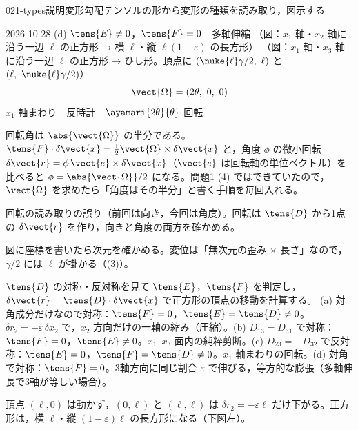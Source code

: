 \documentclass[uplatex,dvipdfmx,a4paper,11pt]{jsarticle}
\begin{document}
\begin{mondai}{021-types}{説明}{変形勾配テンソルの形から変形の種類を読み取り，図示する}
\begin{kotaeutsushi}{2026-10-28}
(d) $\tens{E}\neq0$，$\tens{F}=0$　多軸伸縮
（図：$x_{1}$ 軸・$x_{2}$ 軸に沿う一辺 $\ell$ の正方形 → 横 $\ell$・縦 $\ell(1-\varepsilon)$ の長方形）
（図：$x_{1}$ 軸・$x_{3}$ 軸に沿う一辺 $\ell$ の正方形 → ひし形。頂点に $(\nuke{\ell}\gamma/2,\ \ell)$ と $(\ell,\ \nuke{\ell}\gamma/2)$）
\[ \vect{\Omega}=(2\theta,\ 0,\ 0) \]
$x_{1}$ 軸まわり　反時計　$\ayamari{2\theta}{\theta}$ 回転
\end{kotaeutsushi}
\begin{kizuki}
\item 回転角は $\abs{\vect{\Omega}}$ の半分である。$\tens{F}\cdot\delta\vect{x}=\frac{1}{2}\vect{\Omega}\times\delta\vect{x}$ と，角度 $\phi$ の微小回転 $\delta\vect{r}=\phi\,\vect{e}\times\delta\vect{x}$（$\vect{e}$ は回転軸の単位ベクトル）を比べると $\phi=\abs{\vect{\Omega}}/2$ になる。問題1 (4) ではできていたので，$\vect{\Omega}$ を求めたら「角度はその半分」と書く手順を毎回入れる。
\item {} 回転の読み取りの誤り（前回は向き，今回は角度）。回転は $\tens{D}$ から1点の $\delta\vect{r}$ を作り，向きと角度の両方を確かめる。
\item 図に座標を書いたら次元を確かめる。変位は「無次元の歪み $\times$ 長さ」なので，$\gamma/2$ には $\ell$ が掛かる（(3)）。
\end{kizuki}
\begin{tadashii}
\houshin $\tens{D}$ の対称・反対称を見て $\tens{E}$，$\tens{F}$ を判定し，$\delta\vect{r}=\tens{D}\cdot\delta\vect{x}$ で正方形の頂点の移動を計算する。
\keisan {} (a) 対角成分だけなので対称：$\tens{F}=0$，$\tens{E}=\tens{D}\neq0$。$\delta r_2=-\varepsilon\,\delta x_2$ で，$x_2$ 方向だけの一軸の縮み（圧縮）。(b) $D_{13}=D_{31}$ で対称：$\tens{F}=0$，$\tens{E}\neq0$。$x_1$--$x_3$ 面内の純粋剪断。(c) $D_{23}=-D_{32}$ で反対称：$\tens{E}=0$，$\tens{F}=\tens{D}\neq0$。$x_1$ 軸まわりの回転。(d) 対角で対称：$\tens{F}=0$。3軸方向に同じ割合 $\varepsilon$ で伸びる，等方的な膨張（多軸伸長で3軸が等しい場合）。

 頂点 $(\ell,0)$ は動かず，$(0,\ell)$ と $(\ell,\ell)$ は $\delta r_2=-\varepsilon\ell$ だけ下がる。正方形は，横 $\ell$・縦 $(1-\varepsilon)\ell$ の長方形になる（下図左）。


\end{tadashii}
\end{mondai}
\end{document}
